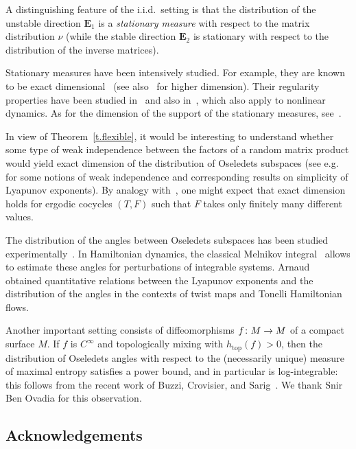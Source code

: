 \documentclass[10pt]{amsart}
\theoremstyle{definition}\newtheorem{defi}[theo]{Definition}\newtheorem{rema}[theo]{Remark}\newtheorem{exam}[theo]{Example}\newtheorem{exem}[theo]{Example}\newtheorem{nota}[theo]{Notation}
\DeclareMathOperator{\topp}{top}
\newcommand{\E}{\mathbf{E}}
\renewcommand*{\to}{\mathchoice{\longrightarrow}{\rightarrow}{\rightarrow}{\rightarrow}}
\begin{document}
A distinguishing feature of the i.i.d.\ setting is that the distribution of the unstable direction $\E_1$ is a \emph{stationary measure} with respect to the matrix distribution $\nu$ (while the stable direction $\E_2$ is stationary with respect to the distribution of the inverse matrices).

Stationary measures have been intensively studied. For example, they are known to be exact dimensional~\cite{HS} (see also~\cite{LL,rapaport} for higher dimension). Their regularity properties have been studied in~\cite{kaufmann} and also in~\cite{GKM,Monakov}, which also apply to nonlinear dynamics. As for the dimension of the support of the stationary measures, see~\cite{CJ}.

In view of Theorem~\ref{t.flexible}, it would be interesting to understand whether some type of weak independence between the factors of a random matrix product would yield exact dimension of the distribution of Oseledets subspaces (see e.g.~\cite{AvilaViana,ledrappierpositive} for some notions of weak independence and corresponding results on simplicity of Lyapunov exponents). By analogy with~\cite{Feng}, one might expect that exact dimension holds for ergodic cocycles $(T,F)$ such that $F$ takes only finitely many different values.


The distribution of the angles between Oseledets subspaces has been studied experimentally~\cite{experimental1,experimental2}. In Hamiltonian dynamics, the classical Melnikov integral~\cite{melnikov} allows to estimate these angles for perturbations of integrable systems. Arnaud~\cite{marieclaude} obtained quantitative relations between the Lyapunov exponents and the distribution of the angles in the contexts of twist maps and Tonelli Hamiltonian flows.

Another important setting consists of diffeomorphisms $f \colon M \to M$ of a compact surface $M$. If $f$ is $C^\infty$ and topologically mixing with $h_{\topp}(f)>0$, then the distribution of Oseledets angles with respect to the (necessarily unique) measure of maximal entropy satisfies a power bound, and in particular is log-integrable: this follows from the recent work of Buzzi, Crovisier, and Sarig~\cite[Corollary~1.11 and Lemma~9.3]{BCS}. We thank Snir Ben Ovadia for this observation.


\subsection*{Acknowledgements}
\end{document}
